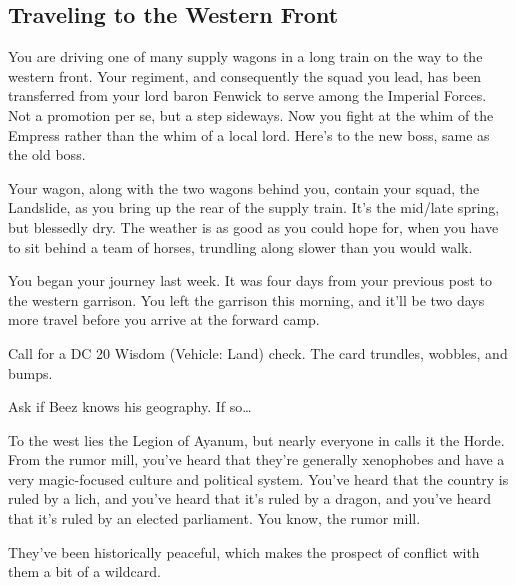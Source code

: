 \begin{multicols}{2}
\subsection{Traveling to the Western Front}
  \begin{aloud}
  You are driving one of many supply wagons in a long train on the way to the western front.
  Your regiment, and consequently the squad you lead, has been transferred from your lord baron
    Fenwick to serve among the Imperial Forces.
  Not a promotion per se, but a step sideways.
  Now you fight at the whim of the Empress rather than the whim of a local lord.
  Here's to the new boss, same as the old boss.
  \end{aloud}
\begin{aloud}

  Your wagon, along with the two wagons behind you, contain your squad, the Landslide, as you
    bring up the rear of the supply train.
  It's the mid/late spring, but blessedly dry.
  The weather is as good as you could hope for, when you have to sit behind a team of horses,
    trundling along slower than you would walk.
\end{aloud}
\begin{aloud}

  You began your journey last week.
  It was four days from your previous post to the western garrison.
  You left the garrison this morning, and it'll be two days more travel before you arrive at the
    forward camp.
  \end{aloud}

Call for a DC 20 Wisdom (Vehicle: Land) check.
The card trundles, wobbles, and bumps.

Ask if Beez knows his geography.
If so\dots

  \begin{aloud}
  To the west lies the Legion of Ayanum, but nearly everyone in calls it the Horde.
  From the rumor mill, you've heard that they're generally xenophobes and have a very magic-focused
    culture and political system.
  You've heard that the country is ruled by a lich, and you've heard that it's ruled by a dragon,
    and you've heard that it's ruled by an elected parliament.
  You know, the rumor mill.

  They've been historically peaceful, which makes the prospect of conflict with them a bit of a
    wildcard.

  \end{aloud}


\end{multicols}
